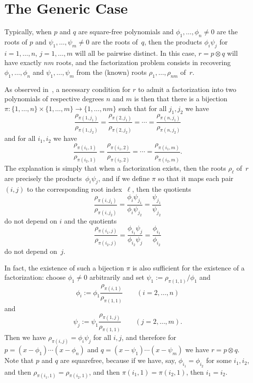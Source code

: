 \documentclass{sig-alternate}
\begin{document}
\section{The Generic Case}

Typically, when $p$ and $q$ are square-free polynomials and $\phi_1,\dots,\phi_n\neq0$
are the roots of $p$ and $\psi_1,\dots,\psi_m\neq0$ are the roots of~$q$, then the
products $\phi_i\psi_j$ for $i=1,\dots,n$, $j=1,\dots,m$ will all be pairwise distinct.
In this case, $r=p\otimes q$ will have exactly $nm$ roots, and the factorization
problem consists in recovering $\phi_1,\dots,\phi_n$ and $\psi_1,\dots,\psi_m$
from the (known) roots $\rho_1,\dots,\rho_{nm}$ of~$r$.

As observed in~\cite{zeilberger13}, a necessary condition for $r$ to admit a factorization
into two polynomials of respective degrees $n$ and $m$ is then that there is a
bijection $\pi\colon\{1,\dots,n\}\times\{1,\dots,m\}\to\{1,\dots,nm\}$ such that for
all $j_1,j_2$ we have
\[
\frac{\rho_{\pi(1,j_1)}}{\rho_{\pi(1,j_2)}}=\frac{\rho_{\pi(2,j_1)}}{\rho_{\pi(2,j_2)}}=\cdots=\frac{\rho_{\pi(n,j_1)}}{\rho_{\pi(n,j_2)}}
\]
and for all $i_1,i_2$ we have
\[
\frac{\rho_{\pi(i_1,1)}}{\rho_{\pi(i_2,1)}}=\frac{\rho_{\pi(i_1,2)}}{\rho_{\pi(i_2,2)}}=\cdots=\frac{\rho_{\pi(i_1,m)}}{\rho_{\pi(i_2,m)}}.
\]
The explanation is simply that when a factorization exists, then the roots $\rho_\ell$ of~$r$
are precisely the products~$\phi_i\psi_j$, and if we define $\pi$ so that it
maps each pair $(i,j)$ to the corresponding root index~$\ell$,
then the quotients
\[
\frac{\rho_{\pi(i,j_1)}}{\rho_{\pi(i,j_2)}}=
\frac{\phi_i\psi_{j_1}}{\phi_i\psi_{j_2}}=
\frac{\psi_{j_1}}{\psi_{j_2}}
\]
do not depend on $i$ and the quotients
\[
\frac{\rho_{\pi(i_1,j)}}{\rho_{\pi(i_2,j)}}=
\frac{\phi_{i_1}\psi_j}{\phi_{i_2}\psi_j}=
\frac{\phi_{i_1}}{\phi_{i_2}}
\]
do not depend on~$j$.

In fact, the existence of such a bijection $\pi$ is also sufficient for the
existence of a factorization:
choose $\phi_1\neq0$ arbitrarily and set $\psi_1:=\rho_{\pi(1,1)}/\phi_1$ and 
\[\phi_i:=\phi_1\frac{\rho_{\pi(i,1)}}{\rho_{\pi(1,1)}}\qquad(i=2,\dots,n)\]
and
\[\psi_j:=\psi_1\frac{\rho_{\pi(1,j)}}{\rho_{\pi(1,1)}}\qquad(j=2,\dots,m).\]
Then we have $\rho_{\pi(i,j)}=\phi_i\psi_j$ for all $i,j$, and therefore 
for $p=(x-\phi_1)\cdots(x-\phi_n)$ and $q=(x-\psi_1)\cdots(x-\psi_m)$
we have $r=p\otimes q$.
Note that $p$ and $q$ are squarefree, because if we have, say, $\phi_{i_1}=\phi_{i_2}$
for some $i_1, i_2$, and then $\rho_{\pi(i_1,1)}=\rho_{\pi(i_2,1)}$,
and then $\pi(i_1,1)=\pi(i_2,1)$, then $i_1=i_2$.
\end{document}
